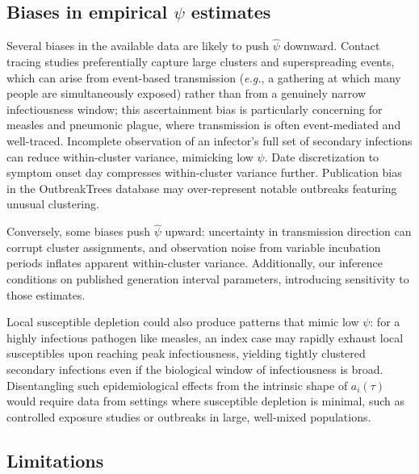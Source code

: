 \documentclass[10pt]{article}
\makeatletter
\newcommand{\eg}{\textit{e.g.}\@\xspace}
\makeatother
\begin{document}
\subsection{Biases in empirical $\psi$ estimates}

Several biases in the available data are likely to push $\hat{\psi}$ downward. Contact tracing studies preferentially capture large clusters and superspreading events, which can arise from event-based transmission (\eg, a gathering at which many people are simultaneously exposed) rather than from a genuinely narrow infectiousness window; this ascertainment bias is particularly concerning for measles and pneumonic plague, where transmission is often event-mediated and well-traced. Incomplete observation of an infector's full set of secondary infections can reduce within-cluster variance, mimicking low $\psi$. Date discretization to symptom onset day compresses within-cluster variance further. Publication bias in the OutbreakTrees database may over-represent notable outbreaks featuring unusual clustering.

Conversely, some biases push $\hat{\psi}$ upward: uncertainty in transmission direction can corrupt cluster assignments, and observation noise from variable incubation periods inflates apparent within-cluster variance. Additionally, our inference conditions on published generation interval parameters, introducing sensitivity to those estimates.

Local susceptible depletion could also produce patterns that mimic low $\psi$: for a highly infectious pathogen like measles, an index case may rapidly exhaust local susceptibles upon reaching peak infectiousness, yielding tightly clustered secondary infections even if the biological window of infectiousness is broad. Disentangling such epidemiological effects from the intrinsic shape of $a_i(\tau)$ would require data from settings where susceptible depletion is minimal, such as controlled exposure studies or outbreaks in large, well-mixed populations.

\subsection{Limitations}
\end{document}
